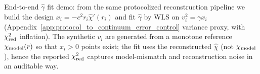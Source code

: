 \noindent\AuditTag End-to-end $\widehat\gamma$ fit demo: from the same protocolized reconstruction pipeline we build the design $x_i=-c^2 r_i \widehat\chi'(r_i)$ and fit $\widehat\gamma$ by WLS on $v_i^2=\gamma x_i$ (Appendix~\ref{app:protocol_to_continuum_error_control} variance proxy, with $\chi^2_{\rm red}$ inflation). The synthetic $v_i$ are generated from a monotone reference $\chi_{\rm model}(r)$ so that $x_i>0$ points exist; the fit uses the reconstructed $\widehat\chi$ (not $\chi_{\rm model}$), hence the reported $\chi^2_{\rm red}$ captures model-mismatch and reconstruction noise in an auditable way.